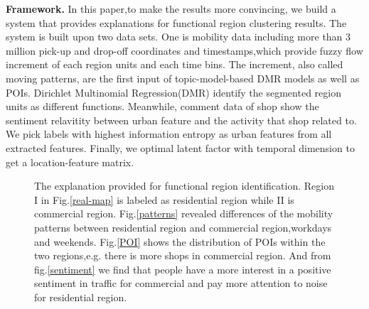 \documentclass[runningheads]{llncs}
\begin{document}
\textbf{Framework.}
In this paper,to make the results more convincing, we build a system that provides explanations for functional region clustering results.
The system is built upon two data sets. One is mobility data including more than 3 million pick-up and drop-off coordinates and timestamps,which provide fuzzy flow increment of each region units and each time bins.
The increment, also called moving patterns, are the first input of topic-model-based DMR models as well as POIs.
Dirichlet Multinomial Regression(DMR) identify the segmented region units as different functions.
Meanwhile, comment data of shop show the sentiment relavitity between urban feature and the activity that shop related to.
We pick labels with highest information entropy as urban features from all extracted features.
Finally, we optimal latent factor with temporal dimension to get a location-feature matrix.



\begin{figure}
\centering
{}
\caption{The explanation provided for functional region identification.
Region I in Fig.\ref{real-map} is labeled as residential region while II is commercial region.
Fig.\ref{patterns} revealed differences of the mobility patterns between residential region and commercial region,workdays and weekends.
Fig.\ref{POI} shows the distribution of POIs within the two regions,e.g. there is more shops in commercial region.
And from fig.\ref{sentiment} we find that people have a more interest in a positive sentiment in traffic for commercial and pay more attention to noise for residential region.}
\label{explanation-example} %
\end{figure}
\end{document}
